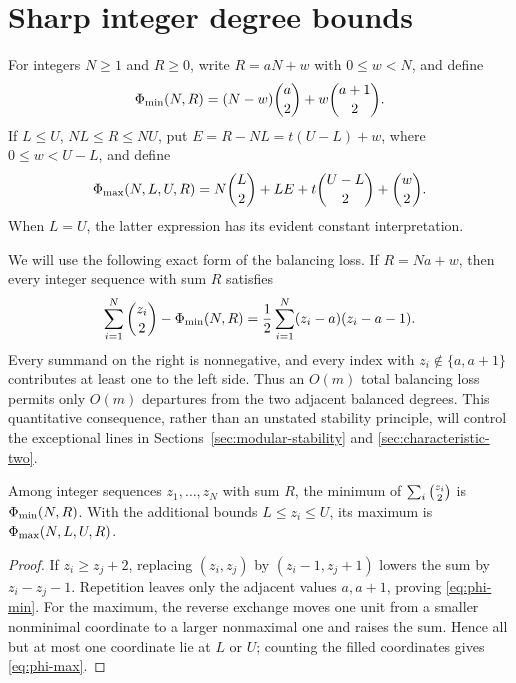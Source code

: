 \section{Sharp integer degree bounds}\label{sec:integer-envelopes}

For integers \(N\ge1\) and \(R\ge0\), write \(R=aN+w\) with
\(0\le w<N\), and define
\begin{equation}\label{eq:phi-min}
 \Phi_{\min}(N,R)=(N-w)\binom{a}{2}+w\binom{a+1}{2}.
\end{equation}
If \(L\le U\), \(NL\le R\le NU\), put
\(E=R-NL=t(U-L)+w\), where \(0\le w<U-L\), and define
\begin{equation}\label{eq:phi-max}
 \Phi_{\max}(N,L,U,R)
 =N\binom{L}{2}+LE+t\binom{U-L}{2}+\binom{w}{2}.
\end{equation}
When \(L=U\), the latter expression has its evident constant interpretation.

We will use the following exact form of the balancing loss.  If
\(R=Na+w\), then every integer sequence with sum \(R\) satisfies
\begin{equation}\label{eq:balancing-loss}
 \sum_{i=1}^N\binom{z_i}{2}-\Phi_{\min}(N,R)
 =\frac12\sum_{i=1}^N(z_i-a)(z_i-a-1).
\end{equation}
Every summand on the right is nonnegative, and every index with
\(z_i\notin\{a,a+1\}\) contributes at least one to the left side.  Thus an
\(O(m)\) total balancing loss permits only \(O(m)\) departures from the two
adjacent balanced degrees.  This quantitative consequence, rather than an
unstated stability principle, will control the exceptional lines in
Sections~\ref{sec:modular-stability} and \ref{sec:characteristic-two}.

\begin{lemma}\label{lem:degree-extrema}
Among integer sequences \(z_1,\dots,z_N\) with sum \(R\), the minimum of
\(\sum_i\binom{z_i}{2}\) is \(\Phi_{\min}(N,R)\).  With the additional bounds
\(L\le z_i\le U\), its maximum is \(\Phi_{\max}(N,L,U,R)\).
\end{lemma}

\begin{proof}
If \(z_i\ge z_j+2\), replacing \((z_i,z_j)\) by
\((z_i-1,z_j+1)\) lowers the sum by \(z_i-z_j-1\).  Repetition leaves only
the adjacent values \(a,a+1\), proving \eqref{eq:phi-min}.  For the maximum,
the reverse exchange moves one unit from a smaller nonminimal coordinate to a
larger nonmaximal one and raises the sum.  Hence all but at most one coordinate
lie at \(L\) or \(U\); counting the filled coordinates gives
\eqref{eq:phi-max}.
\end{proof}

